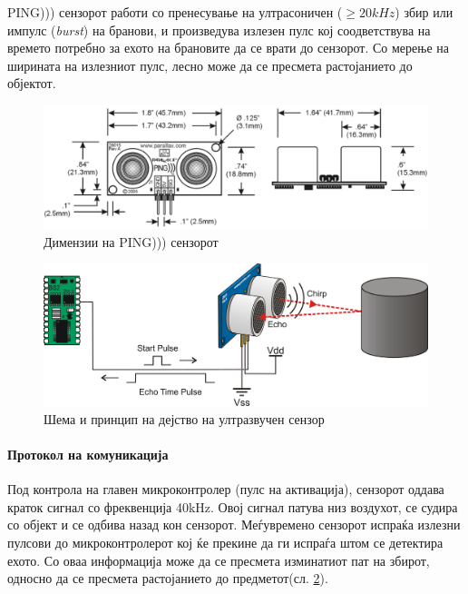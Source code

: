 \documentclass[11pt]{article}
\begin{document}
		  PING))) сензорот работи со пренесување на ултрасоничен ($\geq 20kHz$) збир или импулс (\textit{burst}) на бранови, и произведува излезен пулс кој соодветствува на времето потребно за ехото на брановите да се врати до сензорот. Со мерење на ширината на излезниот пулс, лесно може да се пресмета растојанието до објектот.

		  \begin{figure}[h]
        \includegraphics[width=0.75\linewidth]{./images/ping_dims.png}
        \centering
        \caption{Димензии на PING))) сензорот}
        \label{fig:ping_dims}
        \end{figure}

      \begin{figure}[h]
        \includegraphics[width=0.75\linewidth]{./images/ping.png}
        \centering
        \caption{Шема и принцип на дејство на ултразвучен сензор}
        \label{fig:ping.png}
        \end{figure}

		  \paragraph{Протокол на комуникација\\}
        Под контрола на главен микроконтролер (пулс на активација), сензорот оддава краток сигнал со фреквенција 40kHz. Овој сигнал патува низ воздухот, се судира со објект и се одбива назад кон сензорот. Меѓувремено сензорот испраќа излезни пулсови до микроконтролерот кој ќе прекине да ги испраѓа штом се детектира ехото. Со оваа информација може да се пресмета изминатиот пат на збирот, односно да се пресмета растојанието до предметот(сл. \ref{fig:ping.png}).
\end{document}
